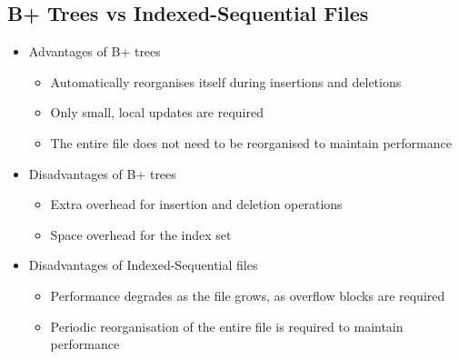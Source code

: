 \subsection*{B+ Trees vs Indexed-Sequential Files}

\begin{itemize}
  \item Advantages of B+ trees
  \begin{itemize}
    \item Automatically reorganises itself during insertions and deletions
    \item Only small, local updates are required
    \item The entire file does not need to be reorganised to maintain performance
  \end{itemize}
  \item Disadvantages of B+ trees
  \begin{itemize}
    \item Extra overhead for insertion and deletion operations
    \item Space overhead for the index set
  \end{itemize}
  \item Disadvantages of Indexed-Sequential files
  \begin{itemize}
    \item Performance degrades as the file grows, as overflow blocks are required
    \item Periodic reorganisation of the entire file is required to maintain performance
  \end{itemize}
\end{itemize}